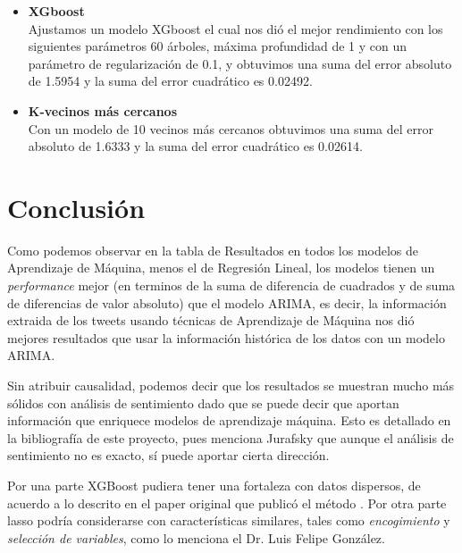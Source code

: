 \documentclass[12pt,reqno,letter]{article}
\begin{document}
\begin{multicols}{2}
\begin{itemize}
  \item \textbf{XGboost} \\
 Ajustamos un modelo XGboost el cual nos dió el mejor rendimiento con los siguientes parámetros 60 árboles, máxima profundidad de 1 y con un parámetro de regularización de 0.1, y obtuvimos una suma del error absoluto de 1.5954 y la suma del error cuadrático es 0.02492. 
 
 \item \textbf{K-vecinos más cercanos} \\
Con un modelo de 10 vecinos más cercanos obtuvimos una suma del error absoluto de 1.6333 y la suma del error cuadrático es 0.02614. 

\end{itemize}


		\section{Conclusión}	
	Como podemos observar en la tabla de Resultados en todos los modelos de Aprendizaje de Máquina, menos el de Regresión Lineal, los modelos tienen un \textit{performance} mejor (en terminos de la suma de diferencia de cuadrados y de suma de diferencias de valor absoluto) que el modelo ARIMA, es decir, la información extraida de los tweets usando técnicas de Aprendizaje de Máquina nos dió mejores resultados que usar la información histórica de los datos con un modelo ARIMA.
	
	Sin atribuir causalidad, podemos decir que los resultados se muestran mucho más sólidos con análisis de sentimiento dado que se puede decir que aportan información que enriquece modelos de aprendizaje máquina. Esto es detallado en la bibliografía de este proyecto, pues menciona Jurafsky que aunque el análisis de sentimiento no es exacto, sí puede aportar cierta dirección. 
	
	Por una parte XGBoost pudiera tener una fortaleza con datos dispersos, de acuerdo a lo descrito en el paper original que publicó el método \cite{xgb}. Por otra parte lasso podría considerarse con características similares, tales como \textit{encogimiento} y \textit{selección de variables}, como lo menciona el Dr. Luis Felipe González\cite{luisfelipe}. 
	


\end{multicols}
\end{document}
